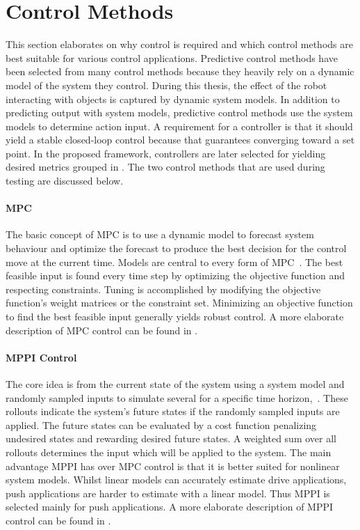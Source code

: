 \section{Control Methods}%
\label{sec:control_methods}
This section elaborates on why control is required and which control methods are best suitable for various control applications. Predictive control methods have been selected from many control methods because they heavily rely on a dynamic model of the system they control. During this thesis, the effect of the robot interacting with objects is captured by dynamic system models. In addition to predicting output with system models, predictive control methods use the system models to determine action input. A requirement for a controller is that it should yield a stable closed-loop control because that guarantees converging toward a set point. In the proposed framework, controllers are later selected for yielding desired metrics grouped in . The two control methods that are used during testing are discussed below.\bs

\paragraph{\acl{MPC}}
The basic concept of \ac{MPC} is to use a dynamic model to forecast system behaviour and optimize the forecast to produce the best decision for the control move at the current time. Models are central to every form of \ac{MPC}~\cite{rawlings_model_2020}. The best feasible input is found every time step by optimizing the objective function and respecting constraints. Tuning is accomplished by modifying the objective function's weight matrices or the constraint set. Minimizing an objective function to find the best feasible input generally yields robust control. A more elaborate description of \ac{MPC} control can be found in .\bs

\paragraph{\acl{MPPI} Control}
The core idea is from the current state of the system using a system model and randomly sampled inputs to simulate several  for a specific time horizon,~\cite{neuromorphictutorial_ltc21_2021}. These rollouts indicate the system's future states if the randomly sampled inputs are applied. The future states can be evaluated by a cost function penalizing undesired states and rewarding desired future states. A weighted sum over all rollouts determines the input which will be applied to the system. The main advantage \ac{MPPI} has over \ac{MPC} control is that it is better suited for nonlinear system models. Whilst linear models can accurately estimate drive applications, push applications are harder to estimate with a linear model. Thus \ac{MPPI} is selected mainly for push applications. A more elaborate description of \ac{MPPI} control can be found in .\bs

